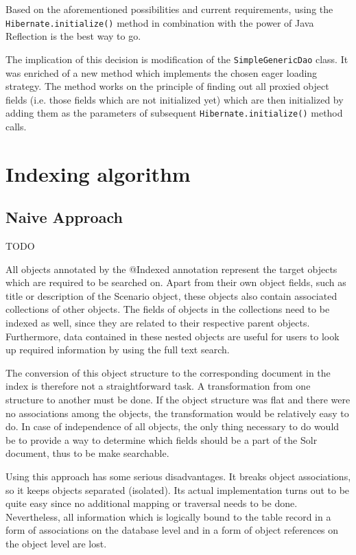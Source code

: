 \documentclass[12pt, oneside, a4paper]{book}
\begin{document}
Based on the aforementioned possibilities and current requirements, using the \texttt{Hibernate.initialize()} method in combination with the power of Java Reflection is the best way to go. 

The implication of this decision is modification of the \texttt{SimpleGenericDao} class. It was enriched of a new method which implements the chosen eager loading strategy. 
The method works on the principle of finding out all proxied object fields (i.e. those fields which are not initialized yet) which are then initialized by adding them as the parameters of subsequent \texttt{Hibernate.initialize()} method calls.



\section{Indexing algorithm}

\subsection{Naive Approach}

TODO

All objects annotated by the @Indexed annotation represent the target objects which are required to be searched on.
Apart from their own object fields, such as title or description of the Scenario object, these objects also contain associated collections of other objects. The fields of objects in the collections need to be indexed as well, since they are related to their respective parent objects. Furthermore, data contained in these nested objects are useful for users to look up required information by using the full text search.

The conversion of this object structure to the corresponding document in the index is therefore not a straightforward task.
A transformation from one structure to another must be done.
If the object structure was flat and there were no associations among the objects, the transformation would be relatively easy to do. In case of independence of all objects, the only thing necessary to do would be to provide a way to determine which fields should be a part of the Solr document, thus to be make searchable.

Using this approach has some serious disadvantages. 
It breaks object associations, so it keeps objects separated (isolated).
Its actual implementation turns out to be quite easy since no additional mapping or traversal needs to be done. 
Nevertheless, all information which is logically bound to the table record in a form of associations on the database level and in a form of object references on the object level are lost.
\end{document}
